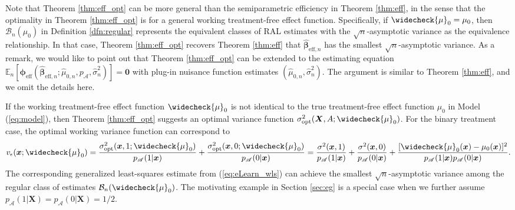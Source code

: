 \documentclass[11pt]{article}
\theoremstyle{definition}
\theoremstyle{remark}
\newcommand{\bx}{\bm{x}}
\newcommand{\bX}{\bm{X}}
\newcommand{\bbeta}{\bm{\beta}}
\newcommand{\bphi}{\bm{\phi}}
\newcommand{\bbE}{\mathbb{E}}
\newcommand{\cB}{\mathcal{B}}
\newcommand{\sA}{\mathscr{A}}
\newcommand{\bzero}{\mathbf{0}}	%
\newcommand{\eff}{\mathrm{eff}}
\newcommand{\opt}{\mathrm{opt}}
\begin{document}
Note that Theorem \ref{thm:eff_opt} can be more general than the semiparametric efficiency in Theorem \ref{thm:eff}, in the sense that the optimality in Theorem \ref{thm:eff_opt} is for a general working treatment-free effect function. Specifically, if $ \widecheck{\mu}_{0} = \mu_{0} $, then $ \cB_{n}(\mu_{0}) $ in Definition \ref{dfn:regular} represents the equivalent classes of RAL estimates with the $ \sqrt{n} $-asymptotic variance as the equivalence relationship. In that case, Theorem \ref{thm:eff_opt} recovers Theorem \ref{thm:eff} that $ \widehat{\bbeta}_{\eff,n} $ has the smallest $ \sqrt{n} $-asymptotic variance. As a remark, we would like to point out that	Theorem \ref{thm:eff_opt} can be extended to the estimating equation $ \bbE_{n}[\bphi_{\eff}(\widehat{\bbeta}_{\eff,n};\widehat{\mu}_{0,n},p_{\sA},\widehat{\sigma}_{n}^{2})] = \bzero $ with plug-in nuisance function estimates $ (\widehat{\mu}_{0,n},\widehat{\sigma}_{n}^{2}) $. The argument is similar to Theorem \ref{thm:eff}, and we omit the details here.


If the working treatment-free effect function $ \widecheck{\mu}_{0} $ is not identical to the true treatment-free effect function $ \mu_{0} $ in Model (\ref{eq:model}), then Theorem \ref{thm:eff_opt} suggests an optimal variance function $ \sigma_{\opt}^{2}(\bX,A;\widecheck{\mu}_{0}) $. For the binary treatment case, the optimal working variance function can correspond to
\[ v_{\epsilon}(\bx;\widecheck{\mu}_{0}) = {\sigma_{\opt}^{2}(\bx,1;\widecheck{\mu}_{0}) \over p_{\sA}(1|\bx)} + {\sigma_{\opt}^{2}(\bx,0;\widecheck{\mu}_{0}) \over p_{\sA}(0|\bx)} = {\sigma^{2}(\bx,1) \over p_{\sA}(1|\bx)} + {\sigma^{2}(\bx,0) \over p_{\sA}(0|\bx)} + {[\widecheck{\mu}_{0}(\bx) - \mu_{0}(\bx)]^{2} \over p_{\sA}(1|\bx)p_{\sA}(0|\bx)}. \]
The corresponding generalized least-squares estimate from (\ref{eq:eLearn_wls}) can achieve the smallest $ \sqrt{n} $-asymptotic variance among the regular class of estimates $ \cB_{n}(\widecheck{\mu}_{0}) $. The motivating example in Section \ref{sec:eg} is a special case when we further assume $ p_{\sA}(1|\bX) = p_{\sA}(0|\bX) = 1/2 $.
\end{document}
